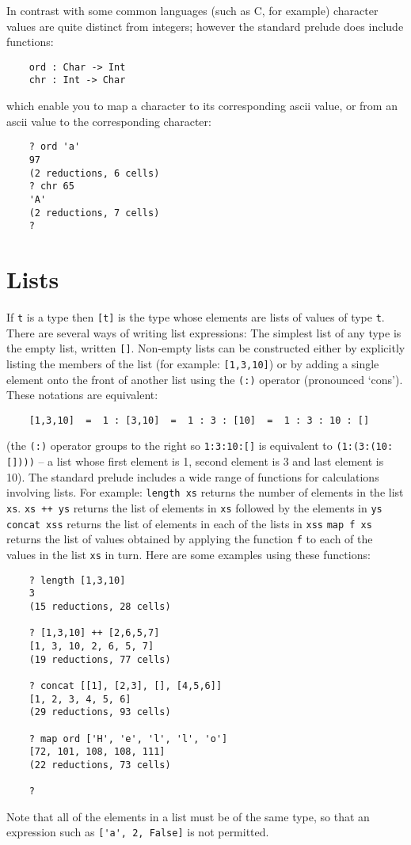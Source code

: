\EQ
In contrast with  some  common  languages  (such  as  C,  for  example)
character values are quite distinct from integers; however the standard
prelude does include functions:
\begin{verbatim}
    ord : Char -> Int
    chr : Int -> Char
\end{verbatim}
which enable you to map a character to its corresponding  {\sc ascii}  value,
or from an {\sc ascii} value to the corresponding character:
\begin{verbatim}
    ? ord 'a'
    97
    (2 reductions, 6 cells)
    ? chr 65
    'A'
    (2 reductions, 7 cells)
    ?         
\end{verbatim}

\section{Lists}
If \verb"t" is a type then \verb"[t]" 
is the type whose elements are lists of  values
of type \verb"t".
There are several ways of writing list expressions:
\BI
\IT   The simplest list of any type is the empty list, written \verb"[]".
\IT   Non-empty lists  can be constructed either by  explicitly listing
      the members of the list (for example: \verb"[1,3,10]") or  by  adding  a
      single element onto the front  of  another  list  using  the  \verb"(:)"
      operator (pronounced `cons').  These notations are equivalent:
\begin{verbatim}
    [1,3,10]  =  1 : [3,10]  =  1 : 3 : [10]  =  1 : 3 : 10 : []
\end{verbatim}
      (the \verb"(:)" operator groups to the right so 
      \verb"1:3:10:[]"  is
      equivalent to \verb"(1:(3:(10:[])))" -- a list whose first element is 1,
      second element is 3 and last element is 10).
\EI
The  standard  prelude  includes  a  wide  range   of   functions   for
calculations involving lists.  For example:
\BSI
\IT  \verb"length xs"  returns the number of elements in the list \verb"xs".
\IT  \verb"xs ++ ys"   returns the list of elements in \verb"xs" followed by the
                elements in \verb"ys"
\IT  \verb"concat xss" returns the list of elements in each of the lists in
                \verb"xss"
\IT  \verb"map f xs"   returns the list of values obtained by applying the
                function \verb"f" to each of the values in the 
                list \verb"xs" in turn.
\ESI
Here are some examples using these functions:
\begin{verbatim}
    ? length [1,3,10]
    3
    (15 reductions, 28 cells)

    ? [1,3,10] ++ [2,6,5,7]
    [1, 3, 10, 2, 6, 5, 7]
    (19 reductions, 77 cells)

    ? concat [[1], [2,3], [], [4,5,6]]
    [1, 2, 3, 4, 5, 6]
    (29 reductions, 93 cells)

    ? map ord ['H', 'e', 'l', 'l', 'o']
    [72, 101, 108, 108, 111]
    (22 reductions, 73 cells)

    ?
\end{verbatim}
Note that all of the elements in a list must be of the  same  type,  so
that an expression such as \verb"['a', 2, False]" is not permitted.

